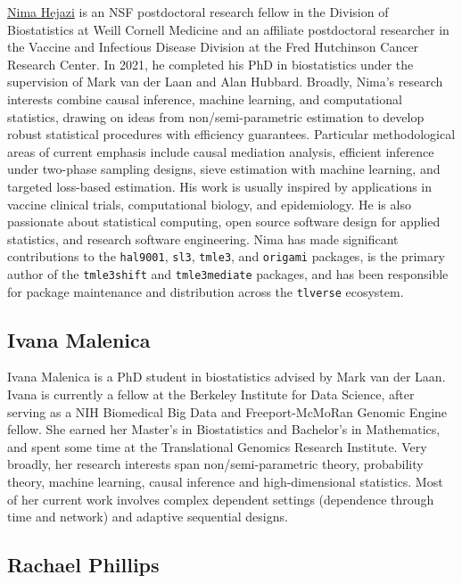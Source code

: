 \documentclass[
  12pt, krantz2,
]{krantz}
\newcommand{\passthrough}[1]{#1}
\newcommand{\1}{\mathbbm{1}}
\theoremstyle{definition}
\theoremstyle{definition}
\theoremstyle{definition}
\theoremstyle{definition}
\theoremstyle{remark}
\begin{document}
\href{https://nimahejazi.org}{Nima Hejazi} is an NSF postdoctoral research fellow in
the Division of Biostatistics at Weill Cornell Medicine and an affiliate
postdoctoral researcher in the Vaccine and Infectious Disease Division at the
Fred Hutchinson Cancer Research Center. In 2021, he completed his PhD in
biostatistics under the supervision of Mark van der Laan and Alan Hubbard.
Broadly, Nima's research interests combine causal inference, machine learning,
and computational statistics, drawing on ideas from non/semi-parametric
estimation to develop robust statistical procedures with efficiency guarantees.
Particular methodological areas of current emphasis include causal mediation
analysis, efficient inference under two-phase sampling designs, sieve estimation
with machine learning, and targeted loss-based estimation. His work is usually
inspired by applications in vaccine clinical trials, computational biology, and
epidemiology. He is also passionate about statistical computing, open source
software design for applied statistics, and research software engineering. Nima
has made significant contributions to the \passthrough{\lstinline!hal9001!}, \passthrough{\lstinline!sl3!}, \passthrough{\lstinline!tmle3!}, and
\passthrough{\lstinline!origami!} packages, is the primary author of the \passthrough{\lstinline!tmle3shift!} and \passthrough{\lstinline!tmle3mediate!}
packages, and has been responsible for package maintenance and distribution
across the \passthrough{\lstinline!tlverse!} ecosystem.

\hypertarget{ivana-malenica}{%
\subsection*{Ivana Malenica}\label{ivana-malenica}}


Ivana Malenica is a PhD student in biostatistics advised by Mark van der Laan.
Ivana is currently a fellow at the Berkeley Institute for Data Science, after
serving as a NIH Biomedical Big Data and Freeport-McMoRan Genomic Engine fellow.
She earned her Master's in Biostatistics and Bachelor's in Mathematics, and
spent some time at the Translational Genomics Research Institute. Very broadly,
her research interests span non/semi-parametric theory, probability theory,
machine learning, causal inference and high-dimensional statistics. Most of her
current work involves complex dependent settings (dependence through time and
network) and adaptive sequential designs.

\hypertarget{rachael-phillips}{%
\subsection*{Rachael Phillips}\label{rachael-phillips}}
\end{document}
